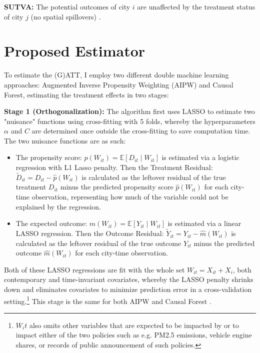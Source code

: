\documentclass[12pt, a4paper]{article}
\begin{document}
\begin{assumption}\label{as:sutva}
\textbf{SUTVA: } The potential outcomes of city $i$ are unaffected by the treatment status of city $j$ (no spatial spillovers) \citep[Ch. 2]{CausalMLBookAppliedCausal}.
\end{assumption}

\section{Proposed Estimator}
\label{sec:proposed_estimator}

To estimate the (G)ATT, I employ two different double machine learning approaches: Augmented Inverse Propensity Weighting (AIPW) and Causal Forest, estimating the treatment effects in two stages:

\textbf{Stage 1 (Orthogonalization): } The algorithm first uses LASSO to estimate two "nuisance" functions using cross-fitting with 5 folds, whereby the hyperparameters $\alpha$ and $C$ are determined once outside the cross-fitting to save computation time. The two nuisance functions are as such:

\begin{itemize}
    \item The propensity score: $p(W_{it}) = \mathbb{E}[D_{it} \mid W_{it}]$ is estimated via a logistic regression with L1 Lasso penalty. Then the Treatment Residual: $\tilde{D}_{it} = D_{it} - \hat{p}(W_{it})$ is calculated as the leftover residual of the true treatment $D_{it}$ minus the predicted propensity score $\hat{p}(W_{it})$ for each city-time observation, representing how much of the variable could not be explained by the regression.
    \item The expected outcome: $m(W_{it}) = \mathbb{E}[Y_{it} \mid W_{it}]$ is estimated via a linear LASSO regression. Then the Outcome Residual: $\tilde{Y}_{it} = Y_{it} - \hat{m}(W_{it})$ is calculated as the leftover residual of the true outcome $Y_{it}$ minus the predicted outcome $\hat{m}(W_{it})$ for each city-time observation.
\end{itemize}

Both of these LASSO regressions are fit with the whole set $W_{it} = X_{it} + X_i$, both contemporary and time-invariant covariates, whereby the LASSO penalty shrinks down and eliminates covariates to minimize prediction error in a cross-validation setting.\footnote{$W_it$ also omits other variables that are expected to be impacted by or to impact either of the two policies such as e.g. PM2.5 emissions, vehicle engine shares, or records of public announcement of such policies.} This stage is the same for both AIPW and Causal Forest \citep[See][]{chernozhukovDoubleDebiasedMachine2018}. 
\end{document}
